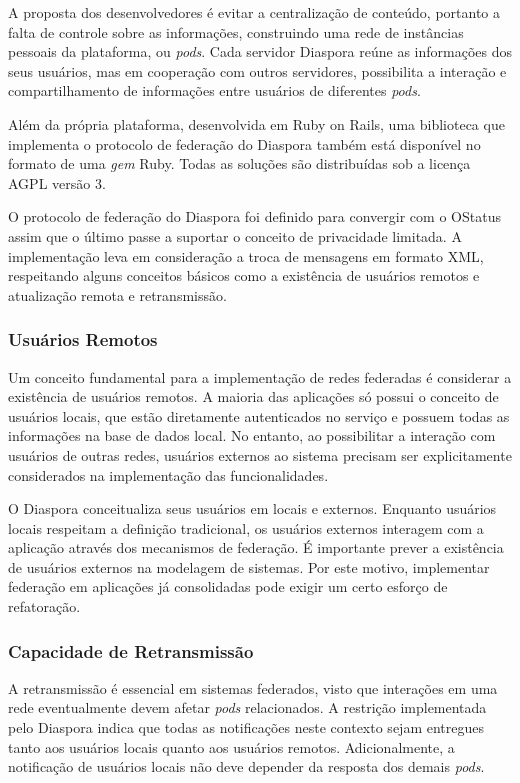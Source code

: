 A proposta dos desenvolvedores é evitar a centralização de conteúdo, portanto a 
falta de controle sobre as informações, construindo uma rede de instâncias pessoais
da plataforma, ou \textit{pods}. Cada servidor Diaspora reúne as informações dos 
seus usuários, mas em cooperação com outros servidores, possibilita a interação
e compartilhamento de informações entre usuários de diferentes \textit{pods}.

Além da própria plataforma, desenvolvida em Ruby on Rails, uma biblioteca que
implementa o protocolo de federação do Diaspora também está disponível no formato
de uma \textit{gem} Ruby. Todas as soluções são distribuídas sob a licença AGPL 
versão 3. 

O protocolo de federação do Diaspora foi definido para convergir com o OStatus
assim que o último passe a suportar o conceito de privacidade limitada. A
implementação leva em consideração a troca de mensagens em formato XML, respeitando
alguns conceitos básicos como a existência de usuários remotos e atualização remota
e retransmissão.

\subsubsection{Usuários Remotos}

Um conceito fundamental para a implementação de redes federadas é considerar a
existência de usuários remotos. A maioria das aplicações só possui o conceito de
usuários locais, que estão diretamente autenticados no serviço e possuem todas as
informações na base de dados local. No entanto, ao possibilitar a interação com
usuários de outras redes, usuários externos ao sistema precisam ser explicitamente
considerados na implementação das funcionalidades.

O Diaspora conceitualiza seus usuários em locais e externos. Enquanto usuários
locais respeitam a definição tradicional, os usuários externos interagem com a
aplicação através dos mecanismos de federação. É importante prever a existência de
usuários externos na modelagem de sistemas. Por este motivo, implementar federação
em aplicações já consolidadas pode exigir um certo esforço de refatoração. %

\subsubsection{Capacidade de Retransmissão}

A retransmissão é essencial em sistemas federados, visto que interações em uma rede
eventualmente devem afetar \textit{pods} relacionados. A restrição implementada
pelo Diaspora indica que todas as notificações neste contexto sejam entregues tanto
aos usuários locais quanto aos usuários remotos. Adicionalmente, a notificação de
usuários locais não deve depender da resposta dos demais \textit{pods}.

